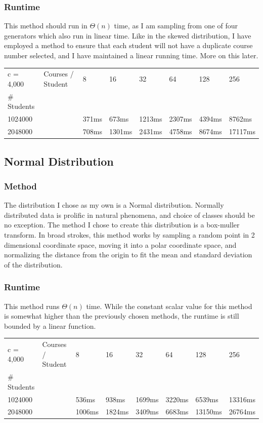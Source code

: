 \documentclass[11pt]{article}
\begin{document}
        \subsubsection{Runtime}
		This method should run in $\Theta(n) $ time, as I am sampling from one of four generators which also run in linear time. Like in the skewed distribution, I have employed a method to ensure that each student will not have a duplicate course number selected, and I have maintained a linear running time. More on this later.
	\begin{table}[h!]
	\begin{tabular}{llllllll}
	c = 4,000   & Courses / Student & 8    & 16   & 32   & 64   & 128  & 256  \\
	\# Students &                   &        &       &       &       &       &       \\
	1024000         &                   & 371ms & 673ms  & 1213ms & 2307ms & 4394ms  & 8762ms \\
	2048000         &                   & 708ms  & 1301ms & 2431ms & 4758ms & 8674ms & 17117ms \\
	\end{tabular}
	\end{table}

	\subsection{Normal Distribution}

	\subsubsection{Method}
		The distribution I chose as my own is a Normal distribution. Normally distributed data is prolific in natural phenomena, and choice of classes should be no exception. The method I chose to create this distribution is a box-muller transform.  In broad strokes, this method works by sampling a random point in 2 dimensional coordinate space, moving it into a polar coordinate space, and normalizing the distance from the origin to fit the mean and standard deviation of the distribution.
	\subsubsection{Runtime}
	This method runs $\Theta(n)$ time. While the constant scalar value for this method is somewhat higher than the previously chosen methods, the runtime is still bounded by a linear function.
	\begin{table}[h!]
	\begin{tabular}{llllllll}
	c = 4,000   & Courses / Student & 8    & 16   & 32   & 64   & 128  & 256  \\
	\# Students &                   &        &       &       &       &       &       \\
	1024000         &                   & 536ms & 938ms  & 1699ms & 3220ms & 6539ms  & 13316ms \\
	2048000         &                   & 1006ms  & 1824ms & 3409ms & 6683ms & 13150ms & 26764ms \\
	\end{tabular}
	\end{table}
\end{document}
